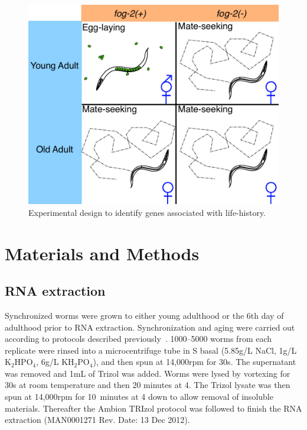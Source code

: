 \documentclass[9pt,twocolumn,twoside]{gsag3jnl}
\begin{document}
\begin{figure}[htbp]
\renewcommand{\familydefault}{\sfdefault}\normalfont{}
\centering
\includegraphics[width=\linewidth]{../output/figs/final_figs/worm_life_fog2_vs_n2.pdf}
\caption{Experimental design to identify genes associated with life-history.
}%
\label{fig:wormlife}
\end{figure}


\section{Materials and Methods}
\label{sec:materials_methods}

\subsection{RNA extraction}
\label{sb:rna_extraction}
Synchronized worms were grown to either young adulthood or the 6th day of adulthood prior to RNA extraction. Synchronization and aging were carried out according to protocols described previously~\citep{}. 1000--5000 worms from each replicate were rinsed into a microcentrifuge tube in S basal (5.85g/L NaCl, 1g/L $\mathrm{K}_2\mathrm{HPO}_4$, 6g/L $\mathrm{KH}_2\mathrm{PO}_4$), and then spun at 14,000rpm for 30s. The supernatant was removed and 1mL of Trizol was added. Worms were lysed by vortexing for 30s at room temperature and then 20 minutes at 4\degree. The Trizol lysate was then spun at 14,000rpm for 10~minutes at 4\degree{} down to allow removal of insoluble materials. Thereafter the Ambion TRIzol protocol was followed to finish the RNA extraction (MAN0001271 Rev. Date: 13 Dec 2012).
\end{document}
